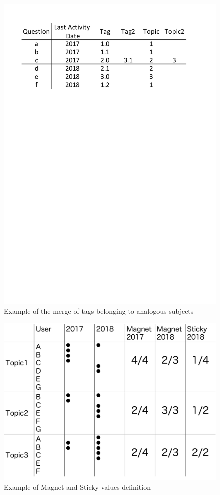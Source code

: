 \documentclass[conference]{IEEEtran}
\begin{document}
\begin{figure}[t]
 \centering
 \includegraphics[width=.9\hsize]{img/example001.pdf}  
 \caption{Example of the merge of tags belonging to analogous subjects} 
 \label{fig:example3} 
\end{figure}
\smallskip

\begin{figure}[t]
 \centering
 \includegraphics[width=.9\hsize]{img/explainofMS.pdf}  
 \caption{Example of Magnet and Sticky values definition} 
 \label{fig:example2} 
\end{figure}
\smallskip
\end{document}
